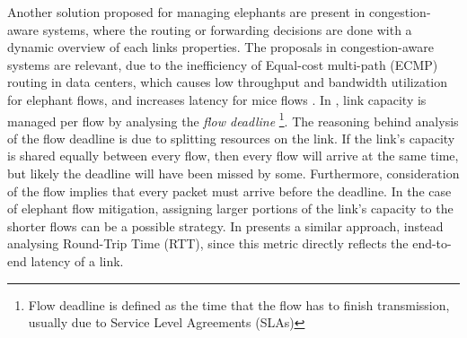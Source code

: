 \par Another solution proposed for managing elephants are present in congestion-aware systems, where the routing or forwarding decisions are done with a dynamic
overview of each links properties. The proposals in congestion-aware systems are relevant, due to the inefficiency of Equal-cost multi-path (ECMP) routing in data
centers, which causes low throughput and bandwidth utilization for elephant flows, and increases latency for mice flows \cite{wang_expeditus:_2017}. In 
\cite{wilson_better_2011}, link capacity is managed per flow by analysing the \textit{flow deadline} \footnote{Flow deadline is defined as the time that the flow has
to finish transmission, usually due to Service Level Agreements (SLAs)}. The reasoning behind analysis of the flow deadline is due to splitting resources on the link.
If the link's capacity is shared equally between every flow, then every flow will arrive at the same time, but likely the deadline will have been missed by some. 
Furthermore, consideration of the flow implies that every packet must arrive before the deadline. In the case of elephant flow mitigation, assigning larger portions
of the link's capacity to the shorter flows can be a possible strategy. In \cite{mittal_timely:_2015} presents a similar approach, instead analysing Round-Trip Time
(RTT), since this metric directly reflects the end-to-end latency of a link.
